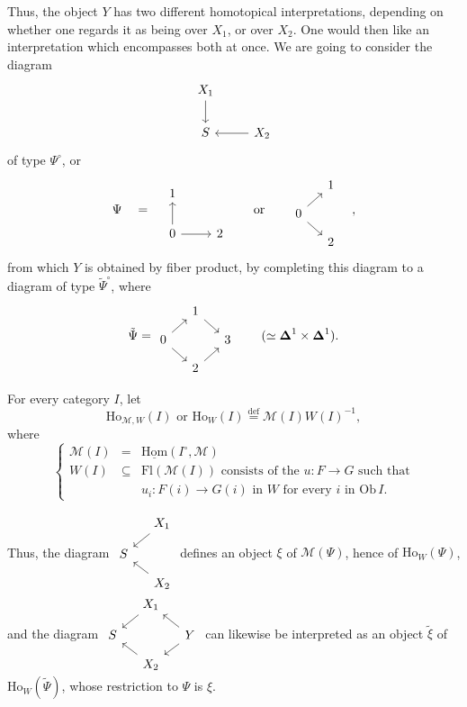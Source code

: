 \documentclass[11pt]{article}
\newcommand{\printedpage}[1]{\marginpar{\footnotesize p.~#1}}
\newcommand{\msp}[1]{\marginpar{\footnotesize [#1]}}
\newcommand{\Homu}{\underline{\mathrm{Hom}}}
\newcommand{\Ho}{\mathrm{Ho}}
\begin{document}
Thus, the object $Y$ has two different homotopical interpretations, depending on whether one regards it as being over $X_1$, or over $X_2$. One would then like an interpretation which encompasses both at once. We are going to consider the diagram
\[
\begin{tikzcd}[ampersand replacement=\&]
X_1 \arrow[d] \& \\
S \& X_2 \arrow[l]
\end{tikzcd}
\]
of type $\Psi^\circ$, or
\[
\Psi \quad = \quad
\begin{tikzcd}[ampersand replacement=\&]
1 \& \\
0 \arrow[u] \arrow[r] \& 2
\end{tikzcd}
\qquad \text{or} \qquad
\begin{tikzcd}[ampersand replacement=\&, row sep=small, column sep=small]
 \& 1 \\
0 \arrow[ur] \arrow[dr] \& \\
 \& 2
\end{tikzcd}
\quad ,
\]
\printedpage{157}
from which $Y$ is obtained by fiber product, by completing this diagram to a diagram of type $\tilde{\Psi}^\circ$, where
\[
\tilde{\Psi} =
\begin{tikzcd}[ampersand replacement=\&, row sep=small, column sep=small]
 \& 1 \arrow[dr] \& \\
0 \arrow[ur] \arrow[dr] \& \& 3 \\
 \& 2 \arrow[ur] \&
\end{tikzcd}
\qquad (\simeq \boldsymbol{\Delta}^1 \times \boldsymbol{\Delta}^1).
\]

\msp{page 243}
For every category $I$, let
\[
\Ho_{\mathcal{M},W}(I) \text{ \ or \ } \Ho_W(I) \overset{\text{def}}{=} \mathcal{M}(I)W(I)^{-1},
\]
where
\[
\left\{
\begin{array}{rcl}
\mathcal{M}(I) & = & \Homu(I^\circ, \mathcal{M}) \\[1ex]
W(I) & \subseteq & \mathrm{Fl}(\mathcal{M}(I)) \text{ consists of the } u : F \longrightarrow G \text{ such that} \\[1ex]
 & & u_i : F(i) \longrightarrow G(i) \text{ in } W \text{ for every } i \text{ in } \mathrm{Ob}\, I.
\end{array}
\right.
\]

Thus, the diagram $\vcenter{\hbox{\begin{tikzcd}[ampersand replacement=\&, row sep=small, column sep=small]
 \& X_1 \arrow[dl] \\
S \& \\
 \& X_2 \arrow[ul]
\end{tikzcd}}}$ defines an object $\xi$ of $\mathcal{M}(\Psi)$, hence of $\Ho_W(\Psi)$, and the diagram $\vcenter{\hbox{\begin{tikzcd}[ampersand replacement=\&, row sep=small, column sep=small]
 \& X_1 \arrow[dl] \& \\
S \& \& Y \arrow[ul] \arrow[dl] \\
 \& X_2 \arrow[ul] \&
\end{tikzcd}}}$ can likewise be interpreted as an object $\tilde{\xi}$ of $\Ho_W(\tilde{\Psi})$, whose restriction to $\Psi$ is $\xi$.
\end{document}
